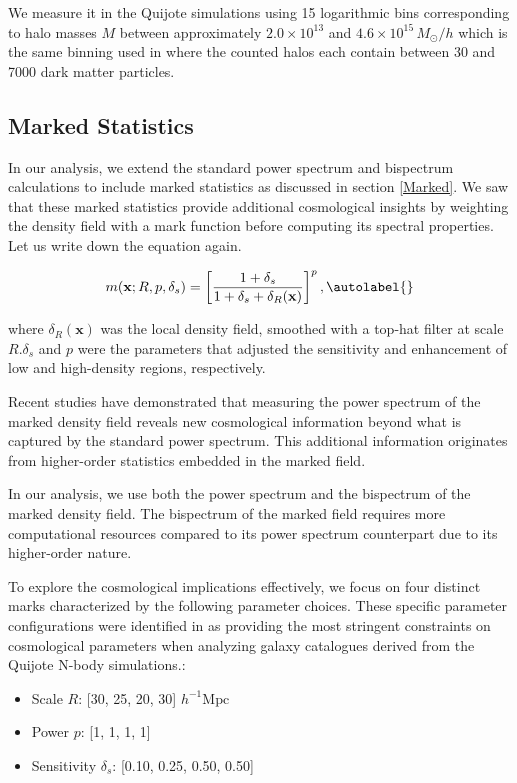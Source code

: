  We measure it in the Quijote simulations using 15 logarithmic bins corresponding to halo masses $M$ between approximately $2.0 \times 10^{13}$ and $4.6 \times 10^{15} \, M_{\odot}/h$ which is the same binning 
 used in \cite{Bayer_2021} where the counted halos each contain between 30 and 7000 dark matter particles.

\subsection{Marked Statistics}
In our analysis, we extend the standard power spectrum and bispectrum calculations to include marked statistics as discussed in section \ref{Marked}. We saw that these marked statistics provide additional cosmological insights by weighting the density field with a mark function before computing its spectral properties. Let us write down the equation again.

\begin{equation}
    m(\mathbf{x}; R, p, \delta_s) = \left[\frac{1 + \delta_s}{1 + \delta_s + \delta_R(\mathbf{x})}\right]^p, \autolabel{}
\end{equation}

where $\delta_R(\mathbf{x})$ was the local density field, smoothed with a top-hat filter at scale $ R $.$ \delta_s $ and $ p $ were the parameters that adjusted the sensitivity and enhancement of low and high-density regions, respectively.

Recent studies \cite{Massara_2021, Massara_2023,jung2024quijotepngoptimizingsummarystatistics} have demonstrated that measuring the power spectrum of the marked density field reveals new cosmological information beyond what is captured by the standard power spectrum. This additional information originates from higher-order statistics embedded in the marked field.

In our analysis, we use both the power spectrum and the bispectrum of the marked density field. The bispectrum of the marked field requires more computational resources compared to its power spectrum counterpart due to its higher-order nature.

To explore the cosmological implications effectively, we focus on four distinct marks characterized by the following parameter choices. These specific parameter configurations were identified in \cite{Massara_2023} as providing the most stringent constraints on cosmological parameters when analyzing galaxy catalogues derived from the Quijote N-body simulations.:
\begin{itemize}
    \item Scale $ R $: [30, 25, 20, 30] $ h^{-1} \mathrm{Mpc} $
    \item Power $ p $: [1, 1, 1, 1]
    \item Sensitivity $ \delta_s $: [0.10, 0.25, 0.50, 0.50]
\end{itemize}

